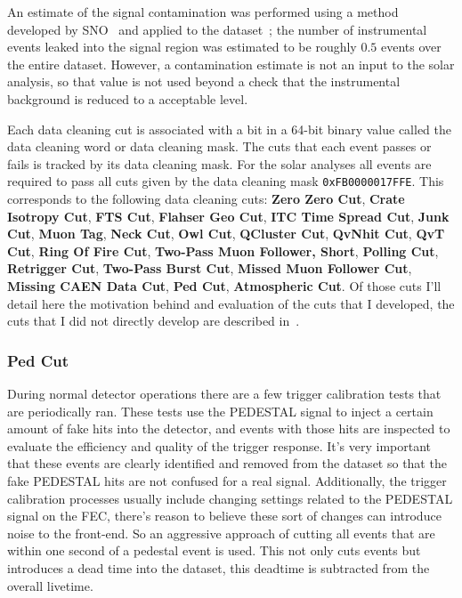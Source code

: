 An estimate of the signal contamination was performed using a method developed
by SNO~\citep{neil_thesis} and applied to the dataset~\citep{dc_document};
the number of instrumental events leaked into the signal region was estimated
to be roughly $0.5$ events over the entire dataset.
However, a contamination estimate is not an input to the solar analysis,
so that value is not used beyond a check that the instrumental background
is reduced to a acceptable level.

Each data cleaning cut is associated with a bit in a 64-bit binary value called
the data cleaning word or data cleaning mask.
The cuts that each event passes or fails is tracked by its data cleaning mask.
For the solar analyses all events are required to pass all cuts
given by the data cleaning mask \texttt{0xFB0000017FFE}.
This corresponds to the following data cleaning cuts:
    \textbf{Zero Zero Cut},
    \textbf{Crate Isotropy Cut},
    \textbf{FTS Cut},
    \textbf{Flahser Geo Cut},
    \textbf{ITC Time Spread Cut},
    \textbf{Junk Cut},
    \textbf{Muon Tag},
    \textbf{Neck Cut},
    \textbf{Owl Cut},
    \textbf{QCluster Cut},
    \textbf{QvNhit Cut},
    \textbf{QvT Cut},
    \textbf{Ring Of Fire Cut},
    \textbf{Two-Pass Muon Follower, Short},
    \textbf{Polling Cut},
    \textbf{Retrigger Cut},
    \textbf{Two-Pass Burst Cut},
    \textbf{Missed Muon Follower Cut},
    \textbf{Missing CAEN Data Cut},
    \textbf{Ped Cut},
    \textbf{Atmospheric Cut}.
Of those cuts I'll detail here the motivation behind and evaluation of the
cuts that I developed, the cuts that I did not directly develop are described in~\citep{dc_document}.

\subsubsection{Ped Cut}
During normal detector operations there are a few trigger calibration
tests that are periodically ran.
These tests use the PEDESTAL signal to inject a certain amount of fake hits
into the detector, and events with those hits are inspected to evaluate the efficiency and
quality of the trigger response.
It's very important that these events are clearly identified and removed from the
dataset so that the fake PEDESTAL hits are not confused for a real signal.
Additionally, the trigger calibration processes usually include changing settings
related to the PEDESTAL signal on the FEC, there's reason to believe these sort
of changes can introduce noise to the front-end.
So an aggressive approach of cutting all events that are within one second of
a pedestal event is used.
This not only cuts events but introduces a dead time into the dataset,
this deadtime is subtracted from the overall livetime.

